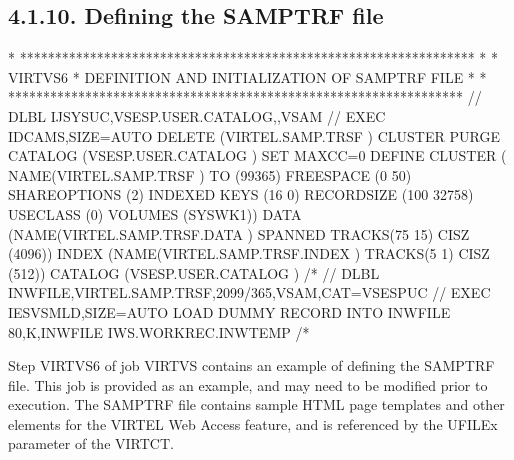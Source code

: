 \documentclass[letterpaper,10pt,english]{sphinxmanual}
\begin{document}
\subsection{4.1.10. Defining the SAMPTRF file}
\label{\detokenize{Installation_Guide:defining-the-samptrf-file}}
\begin{sphinxVerbatim}[commandchars=\\\{\}]
* *****************************************************************
* * VIRTVS6 * DEFINITION AND INITIALIZATION OF SAMPTRF FILE *
* *****************************************************************
// DLBL IJSYSUC,\PYGZsq{}VSESP.USER.CATALOG\PYGZsq{},,VSAM
// EXEC IDCAMS,SIZE=AUTO
  DELETE (VIRTEL.SAMP.TRSF ) \PYGZhy{}
    CLUSTER \PYGZhy{}
    PURGE \PYGZhy{}
    CATALOG (VSESP.USER.CATALOG )
  SET MAXCC=0
  DEFINE CLUSTER ( \PYGZhy{}
    NAME(VIRTEL.SAMP.TRSF ) \PYGZhy{}
    TO (99365) \PYGZhy{}
    FREESPACE (0 50) \PYGZhy{}
    SHAREOPTIONS (2) \PYGZhy{}
    INDEXED \PYGZhy{}
    KEYS (16 0) \PYGZhy{}
    RECORDSIZE (100 32758) \PYGZhy{}
    USECLASS (0) \PYGZhy{}
    VOLUMES (SYSWK1)) \PYGZhy{}
  DATA (NAME(VIRTEL.SAMP.TRSF.DATA ) \PYGZhy{}
    SPANNED \PYGZhy{}
    TRACKS(75 15) \textendash{}
    CISZ (4096)) \PYGZhy{}
  INDEX (NAME(VIRTEL.SAMP.TRSF.INDEX ) \PYGZhy{}
    TRACKS(5 1) \textendash{}
    CISZ (512)) \PYGZhy{}
  CATALOG (VSESP.USER.CATALOG )
/*
// DLBL INWFILE,\PYGZsq{}VIRTEL.SAMP.TRSF\PYGZsq{},2099/365,VSAM,CAT=VSESPUC
// EXEC IESVSMLD,SIZE=AUTO LOAD DUMMY RECORD INTO INWFILE
80,K,INWFILE
\PYGZdl{}\PYGZdl{}\PYGZdl{}\PYGZdl{}IWS.WORKREC.INW\PYGZdl{}TEMP
/*
\end{sphinxVerbatim}


Step VIRTVS6 of job VIRTVS contains an example of defining the SAMPTRF file. This job is provided as an example, and may need to be modified prior to execution. The SAMPTRF file contains sample HTML page templates and other elements for the VIRTEL Web Access feature, and is referenced by the UFILEx parameter of the VIRTCT.
\end{document}
